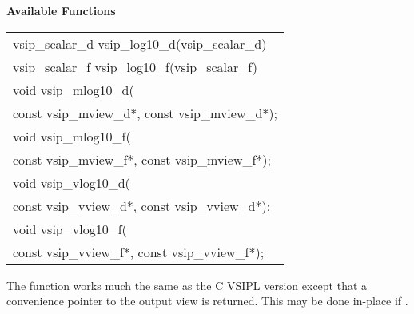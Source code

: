 \cvsiplh
\newline \hspace*{.8cm} \vspace*{.1cm} \textbf{Available Functions }
\newline \hspace*{1.1cm} {
\ttfamily
\begin{tabular}[H]{l}
vsip\_scalar\_d vsip\_log10\_d(vsip\_scalar\_d)\\
vsip\_scalar\_f vsip\_log10\_f(vsip\_scalar\_f)\\
void vsip\_mlog10\_d(\\*\hspace{1cm}const vsip\_mview\_d*, const vsip\_mview\_d*);\\
void vsip\_mlog10\_f(\\*\hspace{1cm}const vsip\_mview\_f*, const vsip\_mview\_f*);\\
void vsip\_vlog10\_d(\\*\hspace{1cm}const vsip\_vview\_d*, const vsip\_vview\_d*);\\
void vsip\_vlog10\_f(\\*\hspace{1cm}const vsip\_vview\_f*, const vsip\_vview\_f*);\\
\end{tabular}
}
\pyjvsiph
{}
\newline\hspace*{1.2cm}\parbox{10.8cm}{\vspace*{.1cm}The  function works much the same as the C VSIPL version except that a convenience pointer to the output view is returned. This may be done in-place if .}

